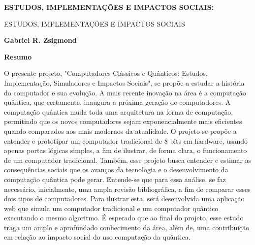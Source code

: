 \thispagestyle{plain}
\begin{center}
    \Large
    \textbf{ESTUDOS, IMPLEMENTAÇÕES E IMPACTOS SOCIAIS:}
    
    \vspace{0.4cm}
    \large
    ESTUDOS, IMPLEMENTAÇÕES E IMPACTOS SOCIAIS
    
    \vspace{0.4cm}
    \textbf{Gabriel R. Zsigmond}
    
    \vspace{0.9cm}
    \textbf{Resumo}
\end{center}
O presente projeto, "Computadores Clássicos e Quânticos: Estudos, Implementação, Simuladores e Impactos Sociais", se propõe a estudar a história do computador e sua evolução. A mais recente inovação na área é a computação quântica, que certamente, inaugura a próxima geração de computadores. A computação quântica muda toda uma arquitetura na forma de computação, permitindo que os novos computadores sejam exponencialmente mais eficientes quando comparados aos mais modernos da atualidade. O projeto se propõe a entender e prototipar um computador tradicional de 8 bits em hardware, usando apenas portas lógicas simples, a fim de ilustrar, de forma clara, o funcionamento de um computador tradicional. Também, esse projeto busca entender e estimar as consequências sociais que os avanços da tecnologia e o desenvolvimento da computação quântica pode gerar. Entende-se que para essa análise, se faz necessário, inicialmente, uma ampla revisão bibliográfica, a fim de comparar esses dois tipos de computadores. Para ilustrar esta, será desenvolvida uma aplicação web que simula um computador tradicional e um computador quântico executando o mesmo algoritmo. É esperado que ao final do projeto, esse estudo traga um amplo e aprofundado conhecimento da área, além de, uma contribuição em relação ao impacto social do uso computação da quântica.